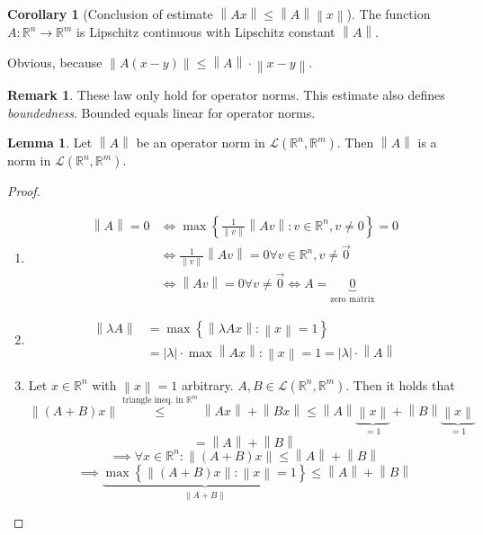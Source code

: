 \documentclass[a4paper,landscape,twocolumn]{article}
\theoremstyle{definition}
\newtheorem{rem}{Remark}
\newtheorem{cor}{Corollary}
\newtheorem{lemma}{Lemma}
\newcommand\set[1]{\left\{#1\right\}}
\newcommand\abs[1]{\left|#1\right|}
\newcommand\norm[1]{\left\|#1\right\|}
\begin{document}
\begin{cor}[Conclusion of estimate $\norm{Ax} \leq \norm{A} \norm{x}$]
  The function $A: \mathbb R^n \to \mathbb R^m$ is Lipschitz continuous with Lipschitz constant $\norm{A}$.

  Obvious, because $\norm{A(x-y)} \leq \norm{A} \cdot \norm{x-y}$.
\end{cor}

\begin{rem}
  These law only hold for operator norms.
  This estimate also defines \emph{boundedness}.
  Bounded equals linear for operator norms.
\end{rem}

\begin{lemma}
  Let $\norm{A}$ be an operator norm in $\mathcal{L}(\mathbb R^n, \mathbb R^m)$.
  Then $\norm{A}$ is a norm in $\mathcal{L}(\mathbb R^n, \mathbb R^m)$.
\end{lemma}
\begin{proof}
  \begin{enumerate}
    \item
      \begin{align*}
        \norm{A} = 0 &\iff \max\set{\frac{1}{\norm{v}} \norm{Av}: v \in \mathbb R^n, v \neq 0} = 0 \\
          &\iff \frac{1}{\norm{v}} \norm{Av} = 0 \forall v \in \mathbb R^n, v \neq \vec{0} \\
          &\iff \norm{Av} = 0 \forall v \neq \vec{0} \iff A = \underbrace{0}_{\text{zero matrix}}
      \end{align*}
    \item \begin{align*}
        \norm{\lambda A} &= \max\set{\norm{\lambda Ax}: \norm{x} = 1} \\
          &= \abs{\lambda} \cdot \max{\norm{Ax}: \norm{x} = 1} = \abs{\lambda} \cdot \norm{A}
      \end{align*}
    \item
      Let $x \in \mathbb R^n$ with $\norm{x} = 1$ arbitrary. $A,B \in \mathcal{L}(\mathbb R^n, \mathbb R^m)$.
      Then it holds that
      \[ \norm{(A+B)x} \overset{\text{triangle ineq. in $\mathbb R^m$}}{\leq} \norm{Ax} + \norm{Bx} \leq \norm{A} \underbrace{\norm{x}}_{=1} + \norm{B} \underbrace{\norm{x}}_{=1} \]
      \[ = \norm{A} + \norm{B} \]
      \[ \implies \forall x \in \mathbb R^n: \norm{(A+B)x} \leq \norm{A} + \norm{B} \]
      \[ \implies \underbrace{\max\set{\norm{(A+B)x}: \norm{x} = 1}}_{\norm{A+B}} \leq \norm{A} + \norm{B} \]
  \end{enumerate}
\end{proof}
\end{document}
